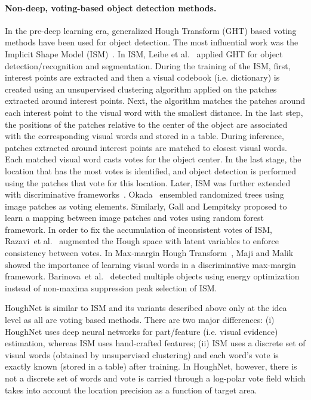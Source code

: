 \documentclass[runningheads]{llncs}
\newcommand{\etal}{et al.}
\begin{document}
\paragraph{\textbf{Non-deep, voting-based object detection methods.}} In the pre-deep learning era, generalized Hough Transform (GHT) based voting methods have been used for object detection. The most influential  work  was  the Implicit Shape Model (ISM)~\cite{ism}. In ISM, Leibe \etal~\cite{ism} applied GHT for object detection/recognition and segmentation. During the training of the ISM, first, interest points are extracted and then a visual codebook (i.e. dictionary) is created using an unsupervised clustering algorithm applied on the patches extracted around interest points. Next, the algorithm matches the patches around each interest point to the visual word with the smallest distance. In the last step, the positions of the patches relative to the center of the object are associated with the corresponding visual words and stored in a table. During inference, patches extracted around interest points are matched to closest visual words. Each matched visual word casts votes for the object center. In the last stage, the location that has the most votes is identified, and object detection is performed using the patches that vote for this location. Later, ISM was further extended with discriminative frameworks~\cite{disc_hough, houghforest1, latent_hough, maxmargin, multiple_hough}. Okada~\cite{disc_hough} ensembled randomized trees using image patches as voting elements. Similarly, Gall and Lempitsky \cite{houghforest1} proposed to learn a mapping between image patches and votes using random forest framework. In order to fix the accumulation of inconsistent votes of ISM, Razavi~\etal~\cite{latent_hough} augmented the Hough space with latent variables to enforce consistency between votes.  In Max-margin Hough Transform~\cite{maxmargin}, Maji and Malik  showed the importance of learning visual words in a discriminative max-margin framework. Barinova~\etal~\cite{multiple_hough} detected multiple objects using energy optimization instead of non-maxima suppression peak  selection of ISM.


HoughNet is similar to ISM and its variants described above only at the idea level as all are voting based methods. There are two major differences: (i) HoughNet uses deep neural networks for part/feature (i.e. visual evidence) estimation, whereas ISM uses hand-crafted features; (ii) ISM uses a discrete set of visual words (obtained by unsupervised clustering) and each word’s vote is exactly known (stored in a table) after training. In HoughNet, however, there is not a discrete set of words and vote is carried through a log-polar vote field which takes into account the location precision as a function of target area. 
\end{document}
